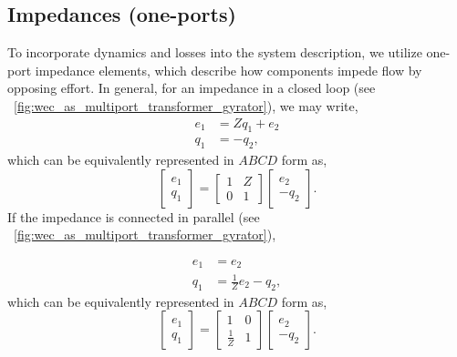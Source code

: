 \documentclass[lettersize,journal]{IEEEtran}
\begin{document}
\subsection{Impedances (one-ports)}\label{sec:impedances}
To incorporate dynamics and losses into the system description, we utilize one-port impedance elements, which describe how components impede flow by opposing effort. 
In general, for an impedance in a closed loop (see \figurename~\ref{fig:wec_as_multiport_transformer_gyrator}), we may write,
%
\begin{subequations}
        \begin{align}
                e_1 &= Zq_1 + e_2 \\
                q_1 &= -q_2 ,
        \end{align}
        \label{eq:impedance_eom}%
\end{subequations}
%
which can be equivalently represented in $ABCD$ form as,
%
\begin{equation}
        \begin{bmatrix}
                e_1 \\ q_1
        \end{bmatrix}
        =
        \begin{bmatrix}
                1 & Z \\ 0 & 1
        \end{bmatrix}
        \begin{bmatrix}
                e_2 \\ - q_2
        \end{bmatrix} .
        \label{eq:impedance_abcd}%
\end{equation}
%
If the impedance is connected in parallel (see \figurename~\ref{fig:wec_as_multiport_transformer_gyrator}),

\begin{subequations}
        \begin{align}
                e_1 &=  e_2 \\
                q_1 &= \frac{1}{Z} e_2 - q_2 ,
        \end{align}
        \label{eq:parallel_impedance_eom}%
\end{subequations}
%
which can be equivalently represented in $ABCD$ form as,
%
\begin{equation}
        \begin{bmatrix}
                e_1 \\ q_1
        \end{bmatrix}
        =
        \begin{bmatrix}
                1 & 0 \\ \frac{1}{Z} & 1
        \end{bmatrix}
        \begin{bmatrix}
                e_2 \\ - q_2
        \end{bmatrix} .
        \label{eq:parallel_impedance_abcd}%
\end{equation}
\end{document}
